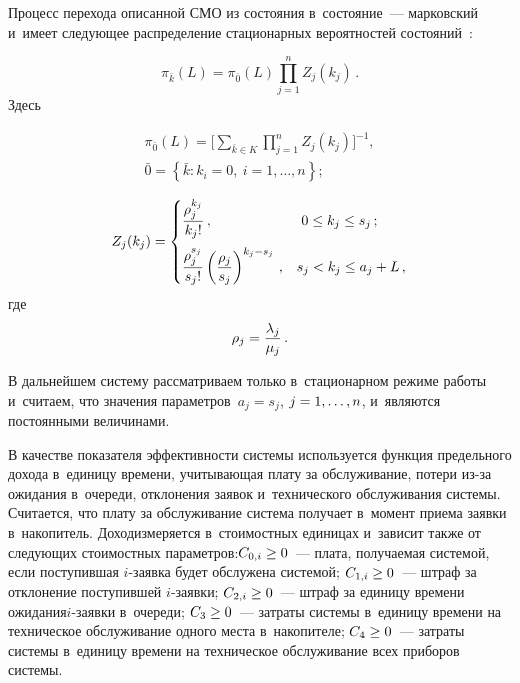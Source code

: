 \begin{multicols}{2}
   Процесс перехода описанной СМО из со\-сто\-яния в~со\-сто\-яние~--- марковский 
и~имеет сле\-ду\-ющее распределение стационарных вероятностей 
со\-сто\-яний~\cite{18-ag}:

\vspace*{-1pt}

\noindent
  \begin{equation}
  \pi_{\bar{k}} (L) =\pi_{\bar{0}}(L) \prod\limits^n_{j=1} Z_j(k_j)\,.
  \label{e1-ag}
  \end{equation}
  Здесь 
  
  \vspace*{-4pt}
  
  \noindent
\begin{multline*}
   \pi_{\bar{0}}(L) =\Bigg[ \sum\limits_{\bar{k}\in K} \prod\limits^n_{j=1} Z_j(k_j)\Bigg]^{-1},\\
   \bar{0} =\left\{ \bar{k}: k_i=0,\ i=1,\ldots , n\right\};
   \end{multline*}
  
  \vspace*{-9pt}
  
  \noindent
  $$
  Z_j(k_j) =\begin{cases}
  \displaystyle\frac{\displaystyle \rho_j^{k_j}\mathstrut}{\displaystyle k_j!\mathstrut}\,, & \ 0\leq k_j \leq s_j\,;\\[12pt]
  \displaystyle\frac{\displaystyle \rho_j^{s_j}\mathstrut}{\displaystyle s_j!\mathstrut} \left( \displaystyle\frac{\displaystyle \rho_j\mathstrut}{\displaystyle s_j\mathstrut}\right)^{k_j-s_j}\,, & s_j< k_j \leq 
a_j+L\,,
  \end{cases}
  $$
  где
  $$
   \rho_j=\displaystyle\frac{\displaystyle \lambda_j\mathstrut}{\displaystyle \mu_j\mathstrut}\,.
   $$



   
   \vspace*{-5pt}
  
  В дальнейшем сис\-те\-му рас\-смат\-ри\-ва\-ем только в~стационарном режиме 
работы и~считаем, что значения па\-ра\-мет\-ров~$a_j=s_j$, $j\hm= 1, \ldots , n$, 
и~являются по\-сто\-ян\-ны\-ми ве\-ли\-чи\-нами. 
  
  В качестве показателя эф\-фек\-тив\-ности сис\-те\-мы используется функция 
предельного дохода в~единицу времени, учи\-ты\-ва\-ющая пла\-ту за обслуживание, 
потери из-за ожидания в~очереди, отклонения заявок и~технического 
обслуживания сис\-те\-мы. Считается, что пла\-ту за обслуживание сис\-те\-ма 
получает в~момент приема заявки в~накопитель. Доход\linebreak измеряется 
в~стоимостных единицах и~зависит так\-же от сле\-ду\-ющих стоимостных 
па\-ра\-мет\-ров:\linebreak $C_{0,i}\hm\geq 0$~--- плата, по\-лу\-ча\-емая сис\-те\-мой, если 
по\-сту\-пив\-шая $i$-за\-яв\-ка будет обслужена сис\-те\-мой;  
$C_{1,i}\hm\geq 0$~--- штраф за отклонение по\-сту\-пив\-шей $i$-за\-яв\-ки; 
$C_{2,i}\hm\geq0$~--- штраф за единицу времени ожидания\linebreak $i$-за\-яв\-ки 
в~очереди; $C_3\hm\geq 0$~--- за\-тра\-ты сис\-те\-мы в~единицу времени на 
техническое обслуживание одного мес\-та в~накопителе; $C_4\hm\geq0$~---  
за\-тра\-ты сис\-те\-мы в~единицу времени на техническое обслуживание всех 
приборов сис\-темы.
  

\end{multicols}
